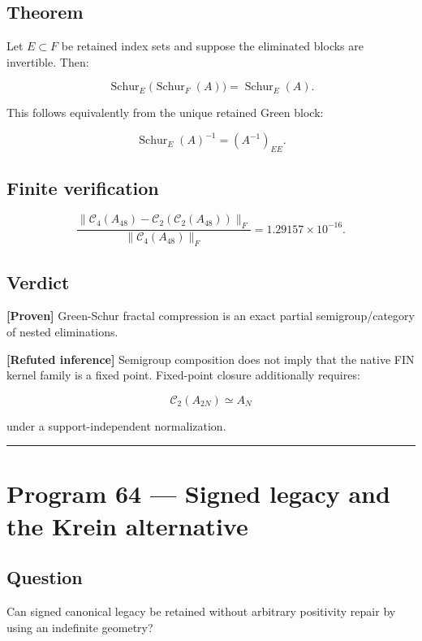 \documentclass[11pt,a4paper,openany]{report}
\newcommand{\statusProven}{\textcolor{fingreen}{[Proven]}}
\begin{document}
\section{Theorem}

Let \(E\subset F\) be retained index sets and suppose the eliminated blocks are invertible. Then:

\[
\operatorname{Schur}_E
\bigl(
\operatorname{Schur}_F(A)
\bigr)
=
\operatorname{Schur}_E(A).
\]

This follows equivalently from the unique retained Green block:

\[
\operatorname{Schur}_E(A)^{-1}
=(A^{-1})_{EE}.
\]

\section{Finite verification}

\[
\frac{
\|\mathcal C_4(A_{48})
-
\mathcal C_2(\mathcal C_2(A_{48}))\|_F
}{
\|\mathcal C_4(A_{48})\|_F
}
=
1.29157\times10^{-16}.
\]

\section{Verdict}

\textbf{\statusProven{}} Green-Schur fractal compression is an exact partial semigroup/\allowbreak{}category of nested eliminations.

\textbf{[Refuted inference]} Semigroup composition does not imply that the native FIN kernel family is a fixed point. Fixed-point closure additionally requires:

\[
\mathcal C_2(A_{2N})\simeq A_N
\]

under a support-independent normalization.

\par\medskip\hrule\medskip

\chapter{Program 64 — Signed legacy and the Krein alternative}

\section{Question}

Can signed canonical legacy be retained without arbitrary positivity repair by using an indefinite geometry?
\end{document}
